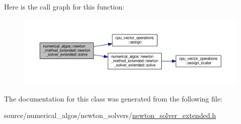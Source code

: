Here is the call graph for this function\-:
\nopagebreak
\begin{figure}[H]
\begin{center}
\leavevmode
\includegraphics[width=350pt]{classnumerical__algos_1_1newton__method__extended_1_1newton__solver__extended_addb6f412050b9e268306890464471d10_cgraph}
\end{center}
\end{figure}




The documentation for this class was generated from the following file\-:\begin{DoxyCompactItemize}
\item 
source/numerical\-\_\-algos/newton\-\_\-solvers/\hyperlink{newton__solver__extended_8h}{newton\-\_\-solver\-\_\-extended.\-h}\end{DoxyCompactItemize}
